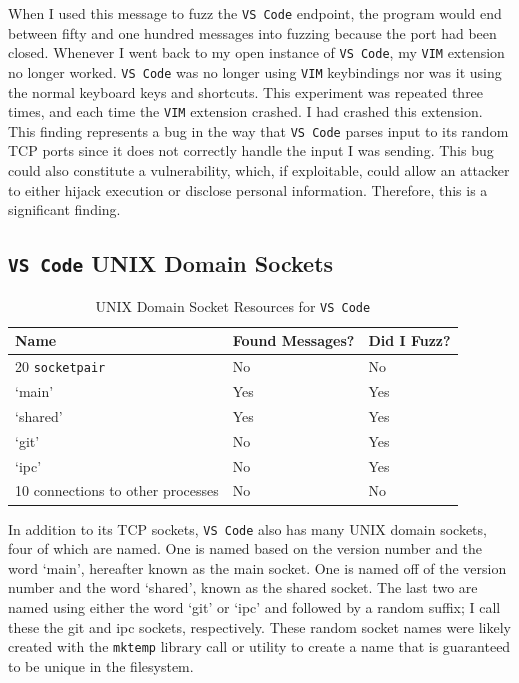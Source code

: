 When I used this message to fuzz the \texttt{VS Code} endpoint, the program would end between fifty and one hundred messages into fuzzing because the port had been closed.  Whenever I went back to my open instance of \texttt{VS Code}, my \texttt{VIM} extension no longer worked.  \texttt{VS Code} was no longer using \texttt{VIM} keybindings nor was it using the normal keyboard keys and shortcuts.  This experiment was repeated three times, and each time the \texttt{VIM} extension crashed.  I had crashed this extension.  This finding represents a bug in the way that \texttt{VS Code} parses input to its random TCP ports since it does not correctly handle the input I was sending.  This bug could also constitute a vulnerability, which, if exploitable, could allow an attacker to either hijack execution or disclose personal information.  Therefore, this is a significant finding.

\subsection{\texttt{VS Code} UNIX Domain Sockets}
\label{sec:codeUnix}

\begin{table}
\centering
\begin{normalsize}
\begin{tabular}{ l | l | l }
\textbf{Name} & \textbf{Found Messages?} & \textbf{Did I Fuzz?} \\ \hline
20 \texttt{socketpair} & No & No \\ \hline
`main' & Yes & Yes \\ \hline
`shared' & Yes & Yes \\ \hline
`git' & No & Yes \\ \hline
`ipc' & No & Yes \\ \hline
10 connections to other processes & No & No \\ \hline
\end{tabular}
\caption{UNIX Domain Socket Resources for \texttt{VS Code}}
\label{tab:vsCodeTcp}
\end{normalsize}
\end{table} 

In addition to its TCP sockets, \texttt{VS Code} also has many UNIX domain sockets,  four of which are named.  One is named based on the version number and the word `main', hereafter known as the main socket.  One is named off of the version number and the word `shared', known as the shared socket.  The last two are named using either the word `git' or `ipc' and followed by a random suffix; I call these the git and ipc sockets, respectively.  These random socket names were likely created with the \texttt{mktemp} library call or utility to create a name that is guaranteed to be unique in the filesystem.

